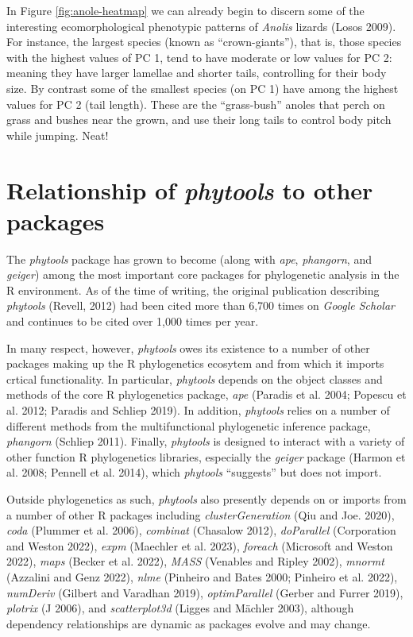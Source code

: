 \documentclass[fleqn,10pt,lineno]{wlpeerj} %
\begin{document}
In Figure \ref{fig:anole-heatmap} we can already begin to discern some of the interesting ecomorphological phenotypic patterns of \emph{Anolis} lizards (Losos 2009). For instance, the largest species (known as ``crown-giants''), that is, those species with the highest values of PC 1, tend to have moderate or low values for PC 2: meaning they have larger lamellae and shorter tails, controlling for their body size. By contrast some of the smallest species (on PC 1) have among the highest values for PC 2 (tail length). These are the ``grass-bush'' anoles that perch on grass and bushes near the grown, and use their long tails to control body pitch while jumping. Neat!

\hypertarget{relationship-of-phytools-to-other-packages}{%
\section{\texorpdfstring{Relationship of \emph{phytools} to other packages}{Relationship of phytools to other packages}}\label{relationship-of-phytools-to-other-packages}}

The \emph{phytools} package has grown to become (along with \emph{ape}, \emph{phangorn}, and \emph{geiger}) among the most important core packages for phylogenetic analysis in the R environment. As of the time of writing, the original publication describing \emph{phytools} (Revell, 2012) had been cited more than 6,700 times on \emph{Google Scholar} and continues to be cited over 1,000 times per year.

In many respect, however, \emph{phytools} owes its existence to a number of other packages making up the R phylogenetics ecosytem and from which it imports crtical functionality. In particular, \emph{phytools} depends on the object classes and methods of the core R phylogenetics package, \emph{ape} (Paradis et al. 2004; Popescu et al. 2012; Paradis and Schliep 2019). In addition, \emph{phytools} relies on a number of different methods from the multifunctional phylogenetic inference package, \emph{phangorn} (Schliep 2011). Finally, \emph{phytools} is designed to interact with a variety of other function R phylogenetics libraries, especially the \emph{geiger} package (Harmon et al. 2008; Pennell et al. 2014), which \emph{phytools} ``suggests'' but does not import.

Outside phylogenetics as such, \emph{phytools} also presently depends on or imports from a number of other R packages including \emph{clusterGeneration} (Qiu and Joe. 2020), \emph{coda} (Plummer et al. 2006), \emph{combinat} (Chasalow 2012), \emph{doParallel} (Corporation and Weston 2022), \emph{expm} (Maechler et al. 2023), \emph{foreach} (Microsoft and Weston 2022), \emph{maps} (Becker et al. 2022), \emph{MASS} (Venables and Ripley 2002), \emph{mnormt} (Azzalini and Genz 2022), \emph{nlme} (Pinheiro and Bates 2000; Pinheiro et al. 2022), \emph{numDeriv} (Gilbert and Varadhan 2019), \emph{optimParallel} (Gerber and Furrer 2019), \emph{plotrix} (J 2006), and \emph{scatterplot3d} (Ligges and Mächler 2003), although dependency relationships are dynamic as packages evolve and may change.
\end{document}
